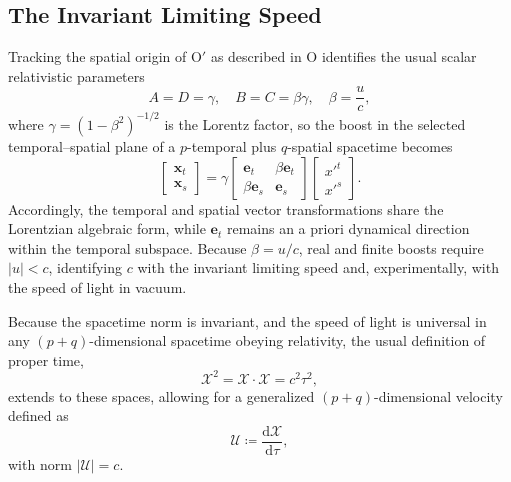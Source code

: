 \subsection{The Invariant Limiting Speed}
Tracking the spatial origin of $\mathrm{O}'$ as described in $\mathrm{O}$ identifies the usual scalar relativistic parameters
\begin{equation}
    A = D = \gamma,\quad B = C = \beta\gamma,\quad \beta = \frac{u}{c},
\end{equation}
where $\gamma = (1 - \beta^{2})^{-1/2}$ is the Lorentz factor, so the boost in the selected temporal--spatial plane of a $p$-temporal plus $q$-spatial spacetime becomes
\begin{equation}\label{eq_extended_lorentz_transform}
    \begin{bmatrix}\mathbf{x}_{t}\\\mathbf{x}_{s}\end{bmatrix}
    = \gamma
    \begin{bmatrix}
        \mathbf{e}_{t} & \beta\mathbf{e}_{t}\\
        \beta\mathbf{e}_{s} & \mathbf{e}_{s}
    \end{bmatrix}
    \begin{bmatrix}x'^{t}\\x'^{s}\end{bmatrix}.
\end{equation}
Accordingly, the temporal and spatial vector transformations share the Lorentzian algebraic form, while $\mathbf{e}_{t}$ remains an a priori dynamical direction within the temporal subspace. Because $\beta = u/c$, real and finite boosts require $|u| < c$, identifying $c$ with the invariant limiting speed and, experimentally, with the speed of light in vacuum.

Because the spacetime norm is invariant, and the speed of light is universal in any $(p+q)$-dimensional spacetime obeying relativity, the usual definition of proper time,
\begin{equation}
\label{eq_pqvector_squared}
    \boldsymbol{\mathcal{X}}^{2}=\boldsymbol{\mathcal{X}} \cdot \boldsymbol{\mathcal{X}} = c^{2}\tau^{2},
\end{equation}
extends to these spaces, allowing for a generalized $(p+q)$-dimensional velocity defined as
\begin{equation}
    \boldsymbol{\mathcal{U}} \coloneqq \frac{\mathrm{d}\boldsymbol{\mathcal{X}}}{\mathrm{d}\tau},
\end{equation}
with norm $|\boldsymbol{\mathcal{U}}| = c$.

